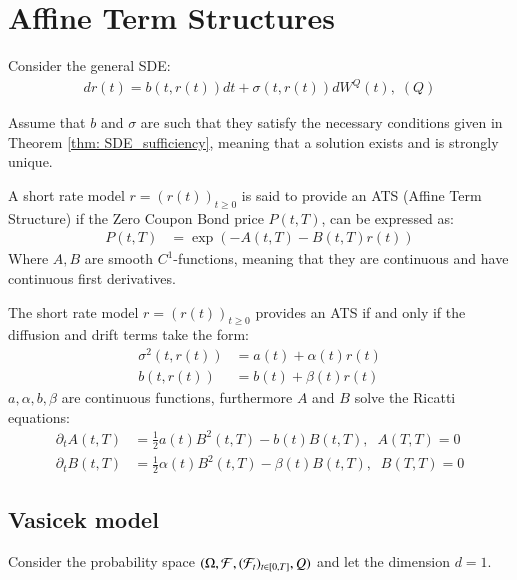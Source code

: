 \newpage 

\section{Affine Term Structures}

Consider the general SDE:
\begin{align}
\label{eq: general_interest_rate_SDE}
dr(t) = b(t,r(t))dt + \sigma(t,r(t))dW^{Q}(t), \; (Q)    
\end{align}

Assume that $b$ and $\sigma$ are such that they satisfy the
necessary conditions given in Theorem \ref{thm: SDE_sufficiency}, meaning that a solution exists and is strongly unique. 

\begin{definition}
A short rate model $r = (r(t))_{t\geq 0}$ is said to provide an ATS (Affine Term Structure) 
if the Zero Coupon Bond price $P(t,T)$, can be expressed as:
\begin{align*}
P(t,T) &= \exp\left(
-A(t,T)-B(t,T)r(t)
\right)    
\end{align*}
Where $A, B$ are smooth $C^{1}$-functions, meaning that they are continuous and have continuous first derivatives.
\end{definition}

\begin{proposition}
\label{prop: condition_on_r_ATS}
The short rate model $r = (r(t))_{t\geq 0}$ provides an ATS if and only if the diffusion and drift terms take the form: 
\begin{align*}
\sigma^{2}(t,r(t)) &= a(t) + \alpha(t)r(t) \\ 
b(t,r(t)) &= b(t) + \beta(t)r(t)
\end{align*}
$a, \alpha, b, \beta$ are continuous functions, furthermore $A$ and $B$ solve the Ricatti equations: 
\begin{align*}
\partial_{t}A(t,T) &= \frac{1}{2}a(t)B^{2}(t,T) - b(t)B(t,T), \;\; A(T,T) = 0 \\ 
\partial_{t}B(t,T) &= \frac{1}{2}\alpha(t)B^{2}(t,T) - \beta(t)B(t,T), \;\; B(T,T) = 0
\end{align*}
\end{proposition}

\subsection{Vasicek model}
Consider the probability space $(\Omega, \mathcal{F}, (\mathcal{F}_{t})_{t \in[0,T]}, Q)$ and let the dimension $d = 1$.

